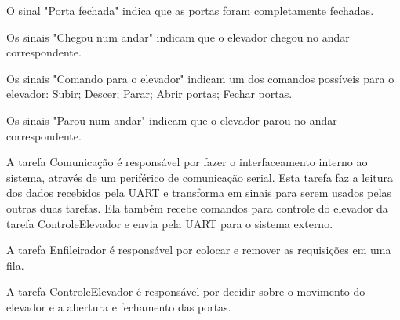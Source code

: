 O sinal "Porta fechada" indica que as portas foram completamente fechadas.

Os sinais "Chegou num andar" indicam que o elevador chegou no andar correspondente.

Os sinais "Comando para o elevador" indicam um dos comandos possíveis para o elevador: Subir; Descer; Parar; Abrir portas; Fechar portas.

Os sinais "Parou num andar" indicam que o elevador parou no andar correspondente.

A tarefa Comunicação é responsável por fazer o interfaceamento interno ao sistema, através de um periférico de comunicação serial. Esta tarefa faz a leitura dos dados recebidos pela UART e transforma em sinais para serem usados pelas outras duas tarefas. Ela também recebe comandos para controle do elevador da tarefa ControleElevador e envia pela UART para o sistema externo.

A tarefa Enfileirador é responsável por colocar e remover as requisições em uma fila.

A tarefa ControleElevador é responsável por decidir sobre o movimento do elevador e a abertura e fechamento das portas.


